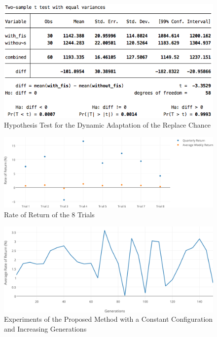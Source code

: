 \documentclass[12pt,journal,compsoc]{IEEEtran}
\begin{document}
\begin{figure}[h!]
\begin{center}
\includegraphics[width=1.00\columnwidth]{figures/dynamic-parameter-statistical-test/dynamic-parameter-statistical-test}
\caption{{\label{dynamic-hypothesis-test}Hypothesis Test for the Dynamic Adaptation of the Replace Chance%
}}
\end{center}
\end{figure}

\begin{figure}[h!]
\begin{center}
\includegraphics[width=1.00\columnwidth]{figures/percent-return-per-trial/percent-return-per-trial}
\caption{{\label{8-trials}Rate of Return of the 8 Trials%
}}
\end{center}
\end{figure}

\begin{figure}[h!]
\begin{center}
\includegraphics[width=1.00\columnwidth]{figures/avg-rate-of-return/avg-rate-of-return}
\caption{{\label{constant-configuration-generations}Experiments of the Proposed Method with a Constant Configuration and Increasing Generations%
}}
\end{center}
\end{figure}
\end{document}
